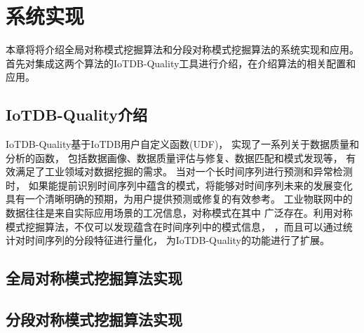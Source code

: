 
\chapter{系统实现}
本章将将介绍全局对称模式挖掘算法和分段对称模式挖掘算法的系统实现和应用。
首先对集成这两个算法的IoTDB-Quality工具进行介绍，在介绍算法的相关配置和
应用。

\section{IoTDB-Quality介绍}
IoTDB-Quality基于IoTDB用户自定义函数(UDF)，
实现了一系列关于数据质量和分析的函数，
包括数据画像、数据质量评估与修复、数据匹配和模式发现等，
有效满足了工业领域对数据挖掘的需求。
当对一个长时间序列进行预测和异常检测时，
如果能提前识别时间序列中蕴含的模式，将能够对时间序列未来的发展变化
具有一个清晰明确的预期，为用户提供预测或修复的有效参考。
工业物联网中的数据往往是来自实际应用场景的工况信息，对称模式在其中
广泛存在。利用对称模式挖掘算法，不仅可以发现蕴含在时间序列中的模式信息，
，而且可以通过统计对时间序列的分段特征进行量化，
为IoTDB-Quality的功能进行了扩展。

\section{全局对称模式挖掘算法实现}


\section{分段对称模式挖掘算法实现}
